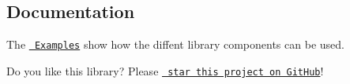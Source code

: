 \subsection*{Documentation}


\begin{DoxyItemize}
\item The \href{https://github.com/sglvladi/NvMemArduino/tree/master/examples}{\texttt{ Examples}} show how the diffent library components can be used.
\end{DoxyItemize}





Do you like this library? Please \href{https://github.com/sglvladi/NvMemArduino}{\texttt{ star this project on Git\+Hub}}! 